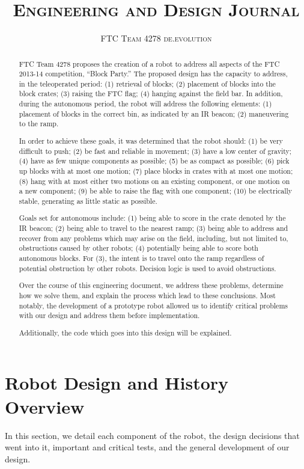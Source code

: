 \documentclass{article}
\title{\textsc{\textbf{Engineering and Design Journal}}}
\author{\textsc{FTC Team 4278 de.evolution}}
\date{}
\begin{document}
\maketitle

\begin{abstract}
FTC Team 4278 proposes the creation of a robot to address all aspects of the FTC 2013-14 competition, ``Block Party.'' The proposed design has the capacity to address, in the teleoperated period: (1) retrieval of blocks; (2) placement of blocks into the block crates; (3) raising the FTC flag; (4) hanging against the field bar. In addition, during the autonomous period, the robot will address the following elements: (1) placement of blocks in the correct bin, as indicated by an IR beacon; (2) maneuvering to the ramp. 

In order to achieve these goals, it was determined that the robot should: (1) be very difficult to push; (2) be fast and reliable in movement; (3) have a low center of gravity; (4) have as few unique components as possible; (5) be as compact as possible; (6) pick up blocks with at most one motion; (7) place blocks in crates with at most one motion; (8) hang with at most either two motions on an existing component, or one motion on a new component; (9) be able to raise the flag with one component; (10) be electrically stable, generating as little static as possible. 

Goals set for autonomous include: (1) being able to score in the crate denoted by the IR beacon; (2) being able to travel to the nearest ramp; (3) being able to address and recover from any problems which may arise on the field, including, but not limited to, obstructions caused by other robots; (4) potentially being able to score both autonomous blocks. For (3), the intent is to travel onto the ramp regardless of potential obstruction by other robots. Decision logic is used to avoid obstructions.

Over the course of this engineering document, we address these problems, determine how we solve them, and explain the process which lead to these conclusions. Most notably, the development of a prototype robot allowed us to identify critical problems with our design and address them before implementation.

Additionally, the code which goes into this design will be explained.
\end{abstract}\newpage\tableofcontents\newpage\setlength{\parskip}{4pt}

\section{Robot Design and History Overview}
In this section, we detail each component of the robot, the design decisions that went into it, important and critical tests, and the general development of our design.
\end{document}
